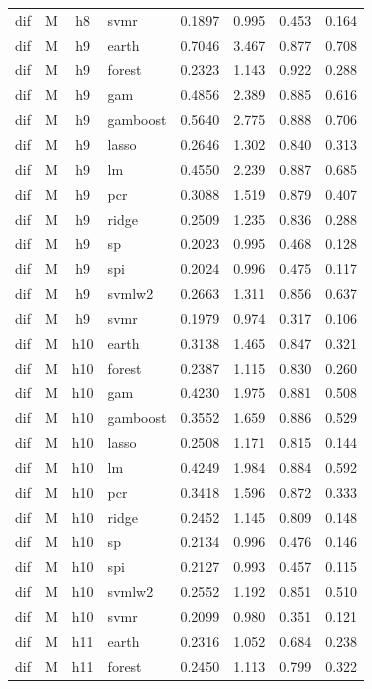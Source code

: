 \begin{ThreePartTable}
\begin{longtable}[t]{llclcccc}
dif & M & h8 & svmr & 0.1897 & 0.995 & 0.453 & 0.164\\
\addlinespace
dif & M & h9 & earth & 0.7046 & 3.467 & 0.877 & 0.708\\
dif & M & h9 & forest & 0.2323 & 1.143 & 0.922 & 0.288\\
dif & M & h9 & gam & 0.4856 & 2.389 & 0.885 & 0.616\\
dif & M & h9 & gamboost & 0.5640 & 2.775 & 0.888 & 0.706\\
dif & M & h9 & lasso & 0.2646 & 1.302 & 0.840 & 0.313\\
dif & M & h9 & lm & 0.4550 & 2.239 & 0.887 & 0.685\\
dif & M & h9 & pcr & 0.3088 & 1.519 & 0.879 & 0.407\\
dif & M & h9 & ridge & 0.2509 & 1.235 & 0.836 & 0.288\\
dif & M & h9 & sp & 0.2023 & 0.995 & 0.468 & 0.128\\
dif & M & h9 & spi & 0.2024 & 0.996 & 0.475 & 0.117\\
dif & M & h9 & svmlw2 & 0.2663 & 1.311 & 0.856 & 0.637\\
dif & M & h9 & svmr & 0.1979 & 0.974 & 0.317 & 0.106\\
\addlinespace
dif & M & h10 & earth & 0.3138 & 1.465 & 0.847 & 0.321\\
dif & M & h10 & forest & 0.2387 & 1.115 & 0.830 & 0.260\\
dif & M & h10 & gam & 0.4230 & 1.975 & 0.881 & 0.508\\
dif & M & h10 & gamboost & 0.3552 & 1.659 & 0.886 & 0.529\\
dif & M & h10 & lasso & 0.2508 & 1.171 & 0.815 & 0.144\\
dif & M & h10 & lm & 0.4249 & 1.984 & 0.884 & 0.592\\
dif & M & h10 & pcr & 0.3418 & 1.596 & 0.872 & 0.333\\
dif & M & h10 & ridge & 0.2452 & 1.145 & 0.809 & 0.148\\
dif & M & h10 & sp & 0.2134 & 0.996 & 0.476 & 0.146\\
dif & M & h10 & spi & 0.2127 & 0.993 & 0.457 & 0.115\\
dif & M & h10 & svmlw2 & 0.2552 & 1.192 & 0.851 & 0.510\\
dif & M & h10 & svmr & 0.2099 & 0.980 & 0.351 & 0.121\\
\addlinespace
dif & M & h11 & earth & 0.2316 & 1.052 & 0.684 & 0.238\\
dif & M & h11 & forest & 0.2450 & 1.113 & 0.799 & 0.322\\

\end{longtable}
\end{ThreePartTable}
